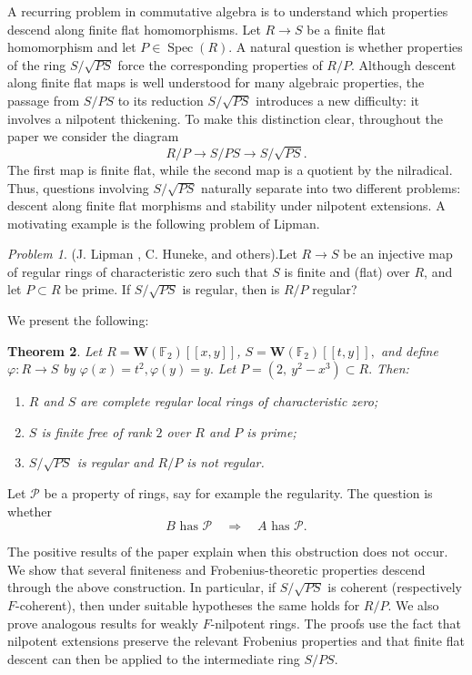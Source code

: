 \documentclass[10pt,a4paper]{amsart}
\newtheorem{theorem}{Theorem}[section]
\theoremstyle{definition}
\theoremstyle{remark}
\newtheorem{problem}[theorem]{Problem}
\begin{document}
A recurring problem in commutative algebra is to understand which
properties descend along finite flat homomorphisms.  Let
\(
R\to S
\)
be a finite flat homomorphism and let \(P\in \operatorname{Spec}(R)\).
A natural question is whether properties of the ring
\(
S/\sqrt{PS}
\)
force the corresponding properties of
\(
R/P.
\)
Although descent along finite flat maps is well understood for many
algebraic properties, the passage from \(S/PS\) to its reduction
\(S/\sqrt{PS}\) introduces a new difficulty: it involves a nilpotent
thickening.
To make this distinction clear, throughout the paper we consider the
diagram
\[
R/P \longrightarrow S/PS \longrightarrow S/\sqrt{PS}.
\]
The first map is finite flat, while the second map is a quotient by the
nilradical.  Thus, questions involving \(S/\sqrt{PS}\) naturally
separate into two different problems:
descent along finite flat morphisms and stability under nilpotent
extensions.
A motivating example is the following problem of Lipman.
\begin{problem}(J. Lipman \cite{j}, C. Huneke, and others).\label{1.1}
	Let
	\(
	R\to S
	\)
	be an injective map of regular rings of  characteristic zero such that $S$ is finite and (flat) over $R$, and let $P\subset R$ be prime. If $S/\sqrt{PS}$ is regular, then is $R/P$ regular?
\end{problem} We present the following:
\begin{theorem}\label{142}
	Let
	\(
	R=\boldsymbol{W}(\mathbb F_2)[[x,y]]\),
	\(
	S=\boldsymbol{W}(\mathbb F_2)[[t,y]],
	\)
	and define
	\(\varphi:R\to S\)
	by
	\(
	\varphi(x)=t^2, 
	\varphi(y)=y.
	\)
	Let
	\(
	P=(2,\ y^2-x^3)\subset R.
	\)
	Then:
	\begin{enumerate}
		\item \(R\) and \(S\) are complete regular local rings of characteristic zero;
		\item \(S\) is finite free of rank \(2\) over \(R\) and \(P\) is prime;

		\item
		\(
		S/\sqrt{PS}
		\)
		is regular and
		\(
		R/P
		\)
		is not regular.
	\end{enumerate}

\end{theorem}
 Let $\mathcal P$ be a property of rings, say for example the regularity.
The question is whether
\[
B\text{ has }\mathcal P\quad\Longrightarrow\quad A\text{ has }\mathcal P.
\]

The positive results of the paper explain when this obstruction does
not occur.  We show that several finiteness and Frobenius-theoretic
properties descend through the above construction.  In particular, if
\(
S/\sqrt{PS}
\)
is coherent (respectively \(F\)-coherent), then under suitable
hypotheses the same holds for \(R/P\).  We also prove analogous results
for weakly \(F\)-nilpotent rings.  The proofs use the fact that
nilpotent extensions preserve the relevant Frobenius properties and
that finite flat descent can then be applied to the intermediate ring
\(S/PS\).
\end{document}
